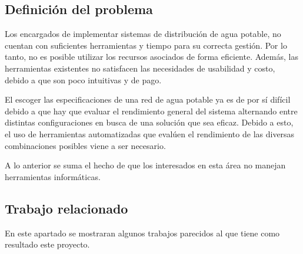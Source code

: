\documentclass[11pt,letterpaper]{article}
\begin{document}
\subsection{Definición del problema} 

Los encargados de implementar sistemas de distribución de agua potable, no cuentan con suficientes herramientas y  tiempo para su correcta gestión. Por lo tanto, no es posible utilizar los recursos asociados de forma eficiente. Además, las herramientas existentes no satisfacen las necesidades de usabilidad y costo, debido a que son poco intuitivas y de pago.

El escoger las especificaciones de una red de agua potable ya es de por sí difícil debido a que hay que evaluar el rendimiento general del sistema alternando entre distintas configuraciones en busca de una solución que sea eficaz. Debido a esto, el uso de herramientas automatizadas que evalúen el rendimiento de las diversas combinaciones posibles viene a ser necesario.

A lo anterior se suma el hecho de que los interesados en esta área no manejan herramientas informáticas.




\subsection{Trabajo relacionado} 

En este apartado se mostraran algunos trabajos parecidos al que tiene como resultado este proyecto.
\end{document}
